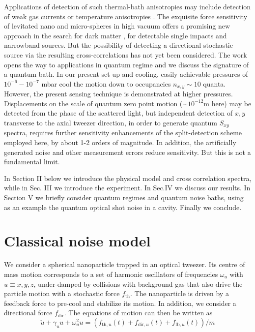 \documentclass[twocolumn,english,notitlepage,superscriptaddress,nofootinbib]{revtex4-2}
\begin{document}
 Applications of detection of such thermal-bath anisotropies may include detection of weak gas currents or temperature anisotropies \cite{Millen2014}.   The exquisite force sensitivity of levitated nano and micro-spheres in high vacuum  offers a promising new approach  in the search for dark matter \cite{Carney2021a,Carney2021b},  for detectable single impacts and narrowband sources.  But the possibility of detecting  a directional stochastic source via the resulting cross-correlations has not yet been considered.  
 The work opens the way to applications in quantum regime and we discuss the signature of a quantum bath.  In our present set-up and cooling,  easily achievable pressures of $10^{-6}-10^{-7}$ mbar cool the motion down to occupancies  $n_{x,y}\sim 10$ quanta.  However, the present sensing technique is demonstrated at  higher pressures.  Displacements  on the scale of quantum zero point motion ($\sim 10^{-12}$m here) may be detected from the phase of the scattered light,  but independent detection of $x,y$ transverse to the axial tweezer direction,   in order to generate quantum $S_{xy}$ spectra,  requires further sensitivity enhancements of the split-detection scheme employed here,
by about 1-2 orders of magnitude.  In addition,  the artificially generated noise and other measurement errors reduce sensitivity.  But this is not a fundamental limit.
 
 In Section II below we introduce the physical model and cross correlation spectra,  while in Sec. III we introduce the experiment.  In Sec.IV we discuss our results.   In Section V we briefly consider quantum regimes and quantum noise baths,  using as an example the quantum optical shot noise in a cavity.   Finally we conclude.
  

\section{Classical noise model}
We consider a spherical nanoparticle trapped in an optical tweezer.  Its centre of mass motion corresponds
to a set of harmonic oscillators of frequencies $\omega_u$ with  $u\equiv x,y,z$,  under-damped by collisions with background gas that also drive the particle motion with a stochastic force $f_{\text{th}}$.  The nanoparticle is  driven by a feedback force to pre-cool and stabilize its motion.  In addition, we consider a directional force $f_{\text{dir}}$. The equations of motion can then be written as
\begin{equation}\label{eq1}
  \ddot{u}+\gamma_u \dot{u}+\omega_u^2 u=(f_{\text{th},u}(t)+f_{\text{dir},u}(t)+f_{\text{fb},u}(t))/m
\end{equation}
\end{document}
